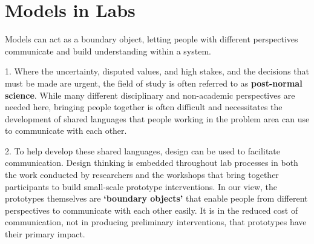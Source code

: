 {%


















\section{Models in Labs}

Models can act as a boundary object, letting people with different perspectives communicate and build understanding within a system.

1. Where the uncertainty, disputed values, and high stakes, and the decisions that must be made are urgent, the field of study is often referred to as \textbf{post-normal science}. While many different disciplinary and non-academic perspectives are needed here, bringing people together is often difficult and necessitates the development of shared languages that people working in the problem area can use to communicate with each other.
 
2. To help develop these shared languages, design can be used to facilitate communication. Design thinking is embedded throughout lab processes in both the work conducted by researchers and the workshops that bring together participants to build small-scale prototype interventions. In our view, the prototypes themselves are \textbf{‘boundary objects’} that enable people from different perspectives to communicate with each other easily. It is in the reduced cost of communication, not in producing preliminary interventions, that prototypes have their primary impact.

}
